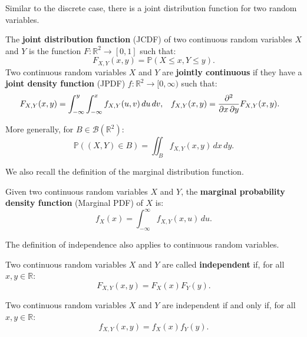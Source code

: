 \documentclass{huhtakm-template-book-v2}
\newcommand{\prob}{\mathbb{P}}
\begin{document}
    Similar to the discrete case, there is a joint distribution function for two random variables.
    \begin{defn}
        The \textbf{joint distribution function} (JCDF) of two continuous random variables $X$ and $Y$ is the function $F:\mathbb{R}^{2} \to [0,1]$ such that:
        \begin{equation*}
            F_{X,Y}(x, y) = \prob(X \leq x,Y \leq y).
        \end{equation*}
        Two continuous random variables $X$ and $Y$ are \textbf{jointly continuous} if they have a \textbf{joint density function} (JPDF) $f:\mathbb{R}^{2} \to [0,\infty)$ such that:
        \begin{align*}
            F_{X,Y}(x, y) &= \int_{-\infty}^{y}\int_{-\infty}^{x}f_{X,Y}(u, v)\,du\,dv, & f_{X,Y}(x, y) &= \pdv*{F_{X,Y}(x, y)}{x,y}.
        \end{align*}
    \end{defn}
    \begin{rem}
        More generally, for $B \in \mathcal{B}(\mathbb{R}^{2})$:
        \begin{equation*}
            \prob((X,Y) \in B) = \iint_{B}f_{X,Y}(x, y)\,dx\,dy.
        \end{equation*}
    \end{rem}
    We also recall the definition of the marginal distribution function.
    \begin{defn}
        Given two continuous random variables $X$ and $Y$, the \textbf{marginal probability density function} (Marginal PDF) of $X$ is:
        \begin{equation*}
            f_{X}(x) = \int_{-\infty}^{\infty} f_{X,Y}(x, u)\,du.
        \end{equation*}
    \end{defn}
    The definition of independence also applies to continuous random variables.
    \begin{defn}
        Two continuous random variables $X$ and $Y$ are called \textbf{independent} if, for all $x,y \in \mathbb{R}$:
        \begin{equation*}
            F_{X,Y}(x, y) = F_{X}(x)F_{Y}(y).
        \end{equation*}
    \end{defn}
    \begin{thm}
        Two continuous random variables $X$ and $Y$ are independent if and only if, for all $x,y \in \mathbb{R}$:
        \begin{equation*}
            f_{X,Y}(x, y) = f_{X}(x)f_{Y}(y).
        \end{equation*}
    \end{thm}
\end{document}
